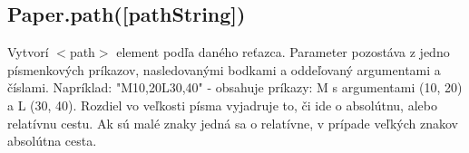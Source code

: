 \subsection{Paper.path([pathString])}
Vytvorí $<$path$>$ element podľa daného reťazca. Parameter pozostáva z jedno písmenkových príkazov, nasledovanými bodkami a oddeľovaný argumentami a číslami. 
Napríklad: "M10,20L30,40" - obsahuje príkazy: M s argumentami (10, 20) a L (30, 40). Rozdiel vo veľkosti písma vyjadruje to, či ide o absolútnu, alebo relatívnu cestu. Ak sú malé znaky jedná sa o relatívne, v prípade veľkých znakov absolútna cesta. 
		

















